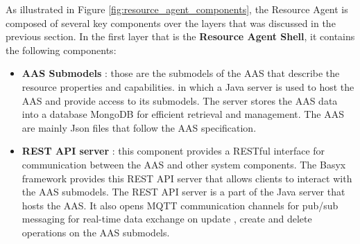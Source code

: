 As illustrated in Figure \ref{fig:resource_agent_components}, the Resource Agent is composed of several key components over the layers that was discussed in the previous section.
In the first layer that is the \textbf{Resource Agent Shell}, it contains the following components:
\begin{itemize}
  \item \textbf{AAS Submodels} : those are the submodels of the AAS that describe the resource properties and capabilities.
  in which a Java server is used to host the AAS and provide access to its submodels.
  The server stores the AAS data into a database MongoDB for efficient retrieval and management.
  The AAS are mainly Json files that follow the AAS specification.
  \item \textbf{REST API server} : this component provides a RESTful interface for communication between the AAS and other system components.
  The Basyx framework provides this REST API server that allows clients to interact with the AAS submodels.
  The REST API server is a part of the Java server that hosts the AAS.
  It also opens MQTT communication channels for pub/sub messaging for real-time data exchange on update , create and delete operations on the AAS submodels. 
\end{itemize}

